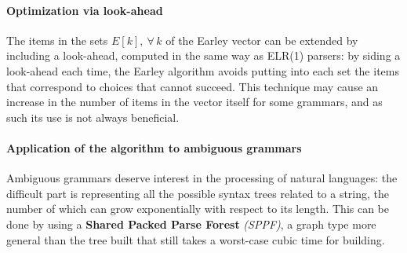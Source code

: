\paragraph*{Optimization via look-ahead}
The items in the sets $E[k], \ \forall \, k$ of the Earley vector can be extended by including a look-ahead, computed in the same way as ELR(1) parsers:
by siding a look-ahead each time, the Earley algorithm avoids putting into each set the items that correspond to choices that cannot succeed.
This technique may cause an increase in the number of items in the vector itself for some grammars, and as such its use is not always beneficial.

\paragraph*{Application of the algorithm to ambiguous grammars}
Ambiguous grammars deserve interest in the processing of natural languages:
the difficult part is representing all the possible syntax trees related to a string, the number of which can grow exponentially with respect to its length.
This can be done by using a \textbf{Shared Packed Parse Forest} \textit{(SPPF)}, a graph type more general than the tree built that still takes a worst-case cubic time for building.